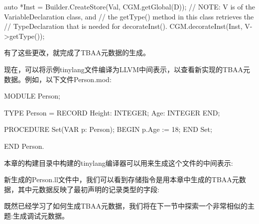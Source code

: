 \begin{cpp}
    auto *Inst = Builder.CreateStore(Val, CGM.getGlobal(D));
    // NOTE: V is of the VariableDeclaration class, and
    // the getType() method in this class retrieves the
    // TypeDeclaration that is needed for decorateInst().
    CGM.decorateInst(Inst, V->getType());
\end{cpp}

有了这些更改，就完成了TBAA元数据的生成。

现在，可以将示例tinylang文件编译为LLVM中间表示，以查看新实现的TBAA元数据。例如，以下文件Person.mod:

\begin{shell}
MODULE Person;

TYPE
    Person = RECORD
                Height: INTEGER;
                Age: INTEGER
             END;

PROCEDURE Set(VAR p: Person);
BEGIN
    p.Age := 18;
END Set;

END Person.
\end{shell}

本章的构建目录中构建的tinylang编译器可以用来生成这个文件的中间表示:


新生成的Person.ll文件中，我们可以看到存储指令是用本章中生成的TBAA元数据，其中元数据反映了最初声明的记录类型的字段:


既然已经学习了如何生成TBAA元数据，我们将在下一节中探索一个非常相似的主题:生成调试元数据。

























